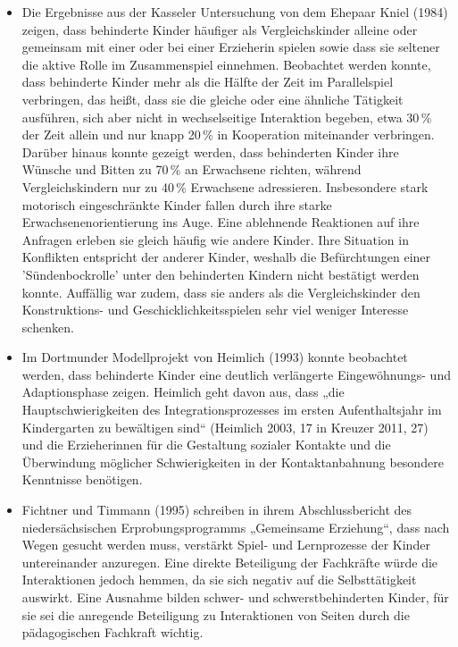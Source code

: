 \begin{itemize}
\item Die Ergebnisse aus der Kasseler Untersuchung von dem Ehepaar Kniel (1984) zeigen, dass behinderte Kinder häufiger als Vergleichskinder alleine oder gemeinsam mit einer oder bei einer Erzieherin spielen sowie dass sie seltener die aktive Rolle im Zusammenspiel einnehmen. Beobachtet werden konnte, dass behinderte Kinder mehr als die Hälfte der Zeit im Parallelspiel verbringen, das heißt, dass sie die gleiche oder eine ähnliche Tätigkeit ausführen, sich aber nicht in wechselseitige Interaktion begeben, etwa 30\,\% der Zeit allein und nur knapp 20\,\% in Kooperation miteinander verbringen. Darüber hinaus konnte gezeigt werden, dass behinderten Kinder ihre Wünsche und Bitten zu 70\,\% an Erwachsene richten, während Vergleichskindern nur zu 40\,\% Erwachsene adressieren. Insbesondere stark motorisch eingeschränkte Kinder fallen durch ihre starke Erwachsenenorientierung ins Auge. Eine ablehnende Reaktionen auf ihre Anfragen erleben sie gleich häufig wie andere Kinder. Ihre Situation in Konflikten entspricht der anderer Kinder, weshalb die Befürchtungen einer 'Sündenbockrolle' unter den behinderten Kindern nicht bestätigt werden konnte. Auffällig war zudem, dass sie anders als die Vergleichskinder den Konstruktions- und Geschicklichkeitsspielen sehr viel weniger Interesse schenken.

\item Im Dortmunder Modellprojekt von Heimlich (1993) konnte beobachtet werden, dass behinderte Kinder eine deutlich verlängerte Eingewöhnungs- und Adaptionsphase zeigen. Heimlich geht davon aus, dass „die Hauptschwierigkeiten des Integrationsprozesses im ersten Aufenthaltsjahr im Kindergarten zu bewältigen sind“ (Heimlich 2003, 17 in Kreuzer 2011, 27) und die Erzieherinnen für die Gestaltung sozialer Kontakte und die Überwindung möglicher Schwierigkeiten in der Kontaktanbahnung besondere Kenntnisse benötigen.

\item Fichtner und Timmann (1995) schreiben in ihrem Abschlussbericht des niedersächsischen Erprobungsprogramms „Gemeinsame Erziehung“, dass nach Wegen gesucht werden muss, verstärkt Spiel- und Lernprozesse der Kinder untereinander anzuregen. Eine direkte Beteiligung der Fachkräfte würde die Interaktionen jedoch hemmen, da sie sich negativ auf die Selbsttätigkeit auswirkt. Eine Ausnahme bilden schwer- und schwerstbehinderten Kinder, für sie sei die anregende Beteiligung zu Interaktionen von Seiten durch die pädagogischen Fachkraft wichtig. 


\end{itemize}
